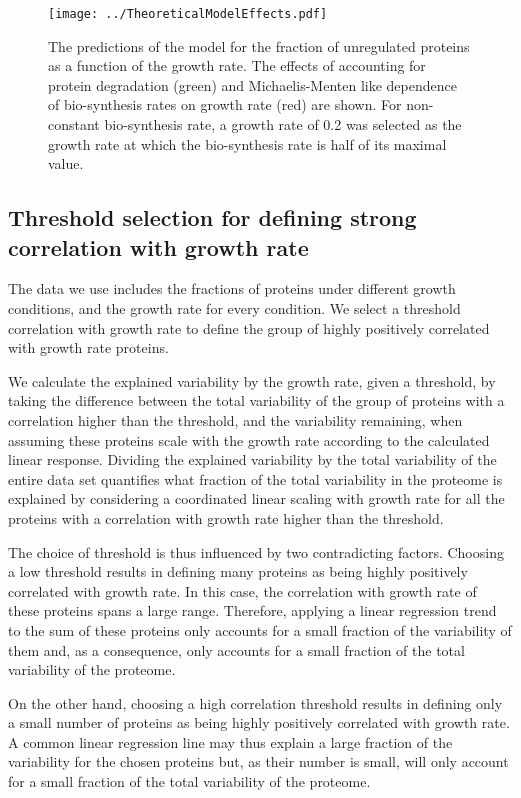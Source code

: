 \documentclass{article}
\begin{document}
\begin{figure}[H]
\begin{center}
\texttt{[image: ../TheoreticalModelEffects.pdf]}
\caption{\label{fig:theoreticalpred}
The predictions of the model for the fraction of unregulated proteins as a function of the growth rate.
The effects of accounting for protein degradation (green) and Michaelis-Menten like dependence of bio-synthesis rates on growth rate (red) are shown.
For non-constant bio-synthesis rate, a growth rate of 0.2 was selected as the growth rate at which the bio-synthesis rate is half of its maximal value.%
}
\end{center}
\end{figure}

\subsection{Threshold selection for defining strong correlation with growth rate}
\label{corrthreshold} 
The data we use includes the fractions of proteins under different growth conditions, and the growth rate for every condition.
We select a threshold correlation with growth rate to define the group of highly positively correlated with growth rate proteins.

We calculate the explained variability by the growth rate, given a threshold, by taking the difference between the total variability of the group of proteins with a correlation higher than the threshold, and the variability remaining, when assuming these proteins scale with the growth rate according to the calculated linear response.
Dividing the explained variability by the total variability of the entire data set quantifies what fraction of the total variability in the proteome is explained by considering a coordinated linear scaling with growth rate for all the proteins with a correlation with growth rate higher than the threshold.

The choice of threshold is thus influenced by two contradicting factors.
Choosing a low threshold results in defining many proteins as being highly positively correlated with growth rate.
In this case, the correlation with growth rate of these proteins spans a large range.
Therefore, applying a linear regression trend to the sum of these proteins only accounts for a small fraction of the variability of them and, as a consequence, only accounts for a small fraction of the total variability of the proteome.

On the other hand, choosing a high correlation threshold results in defining only a small number of proteins as being highly positively correlated with growth rate.
A common linear regression line may thus explain a large fraction of the variability for the chosen proteins but, as their number is small, will only account for a small fraction of the total variability of the proteome.
\end{document}
